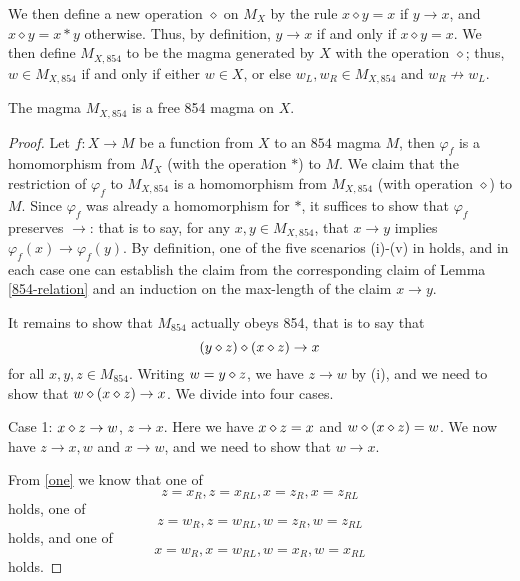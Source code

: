 We then define a new operation $\diamond$ on $M_X$ by the rule $x \diamond y = x$ if $y \to x$, and $x \diamond y = x*y$ otherwise. Thus, by definition, $y \to x$ if and only if $x \diamond y = x$.  We then define $M_{X,854}$ to be the magma generated by $X$ with the operation $\diamond$; thus, $w \in M_{X,854}$ if and only if either $w \in X$, or else $w_L, w_R \in M_{X,854}$ and $w_R \not \to w_L$.

\begin{theorem}\label{free-854}  The magma $M_{X,854}$ is a free 854 magma on $X$.
\end{theorem}

\begin{proof}  Let  $f: X \to M$ be a function from $X$ to an $854$ magma $M$, then $\varphi_f$ is a homomorphism from $M_X$ (with the operation $*$) to $M$.  We claim that the restriction of $\varphi_f$ to $M_{X,854}$ is a homomorphism from $M_{X,854}$ (with operation $\diamond$) to $M$.  Since $\varphi_f$ was already a homomorphism for $*$, it suffices to show that $\varphi_f$ preserves $\to$: that is to say, for any $x,y \in M_{X,854}$, that $x \to y$ implies $\varphi_f(x) \to \varphi_f(y)$.  By definition, one of the five scenarios (i)-(v) in  holds, and in each case one can establish the claim from the corresponding claim of Lemma \ref{854-relation} and an induction on the max-length of the claim $x \to y$.

It remains to show that $M_{854}$ actually obeys 854, that is to say that
$$ (y \diamond z) \diamond (x \diamond z) \to x$$
for all $x,y,z \in M_{854}$.  Writing $w = y \diamond z$, we have $z \to w$ by (i), and we need to show that $w \diamond (x \diamond z) \to x$.  We divide into four cases.

Case 1: $x \diamond z \to w$, $z \to x$.  Here we have $x \diamond z = x$ and $w \diamond (x \diamond z) = w$.  We now have $z \to x,w$ and $x \to w$, and we need to show that $w \to x$.

From \eqref{one} we know that one of
\begin{equation}\label{one-1}
  z = x_R, z = x_{RL}, x = z_R, x = z_{RL}
\end{equation}
holds, one of
\begin{equation}\label{one-2}
  z = w_R, z = w_{RL}, w = z_R, w = z_{RL}
\end{equation}
holds, and one of
\begin{equation}\label{one-3}
  x = w_R, x = w_{RL}, w = x_R, w = x_{RL}
\end{equation}
holds.


\end{proof}
